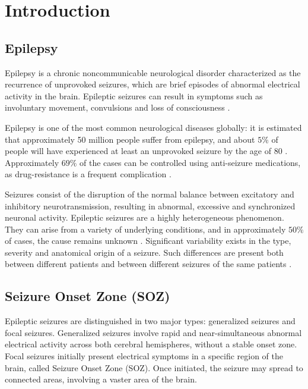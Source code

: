 \pagestyle{fancy}
\fancyhead{}

\fancyheadoffset{0cm}
\renewcommand{\headrulewidth}{1pt} 
\renewcommand{\footrulewidth}{0pt}
\fancyhead[L]{{\thesection}}
\fancyhead[L]{\leftmark}


\section{Introduction}

\subsection{Epilepsy}

Epilepsy is a chronic noncommunicable neurological disorder characterized as 
the recurrence of unprovoked seizures, which are brief episodes of abnormal
electrical activity in the brain.
Epileptic seizures can result in symptoms such as involuntary movement,
convulsions and loss of consciousness \cite{WHO2016Epilepsy}.

Epilepsy is one of the most common neurological diseases globally: it is
estimated that approximately 50 million people suffer from epilepsy, and
about $5\%$ of people will have experienced at least an unprovoked seizure by
the age of 80 \cite{ep-wilden}.
Approximately $69\%$ of the cases can be controlled using anti-seizure
medications, as drug-resistance is a frequent complication
\cite{ep-drug1, ep-drug2, ep-drug3}.

Seizures consist of the disruption of the normal balance between 
excitatory and inhibitory neurotransmission,
resulting in abnormal, excessive and synchronized neuronal activity.
Epileptic seizures are a highly heterogeneous phenomenon.
They can arise from a variety of underlying conditions, and in approximately
$50\%$ of cases, the cause remains unknown \cite{WHO2016Epilepsy}.
Significant variability exists in the type, severity and anatomical origin of a
seizure.
Such differences are present both between different patients and between
different seizures of the same patients \cite{ep-hetero}.  

\subsection{Seizure Onset Zone (SOZ)}

Epileptic seizures are distinguished in two major types: generalized seizures
and focal seizures.
Generalized seizures involve rapid and near-simultaneous abnormal electrical
activity across both cerebral hemispheres, without a stable onset zone. 
Focal seizures initially present electrical symptoms in a specific region of
the brain, called Seizure Onset Zone (SOZ).
Once initiated, the seizure may spread to connected areas, involving a vaster 
area of the brain. \cite{ep-class}

